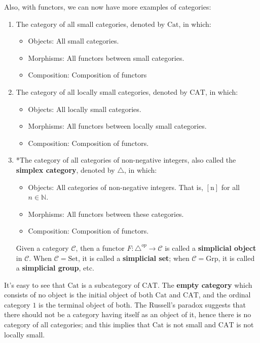	\begin{example}
	Also, with functors, we can now have more examples of categories:
		\begin{enumerate}[label=(\roman*)]
			\item The category of all small categories, denoted by $\mathrm{Cat}$, in which:
				\begin{itemize}
					\item Objects: All small categories.
					\item Morphisms: All functors between small categories.
					\item Composition: Composition of functors
				\end{itemize}
			\item The category of all locally small categories, denoted by $\mathrm{CAT}$, in which:
				\begin{itemize}
					\item Objects: All locally small categories.
					\item Morphisms: All functors between locally small categories.
					\item Composition: Composition of functors.
				\end{itemize}
				
			\item *The category of all categories of non-negative integers, also called the \textbf{simplex category}, denoted by $\triangle$, in which:
				\begin{itemize}
					\item Objects: All categories of non-negative integers. That is, $[\mathrm{n}]$ for all $n\in \mathbb{N}$.
					\item Morphisms: All functors between these categories.
					\item Composition: Composition of functors.
				\end{itemize}
		Given a category $\mathcal{C}$, then a functor $F:\triangle^{op}\to \mathcal{C}$ is called a \textbf{simplicial object} in $\mathcal{C}$. When $\mathcal{C}=\mathrm{Set}$, it is called a \textbf{simplicial set}; when $\mathcal{C}=\mathrm{Grp}$, it is called a \textbf{simplicial group}, etc.
		\end{enumerate}
	\end{example}
	It's easy to see that $\mathrm{Cat}$ is a subcategory of $\mathrm{CAT}$. The \textbf{empty category} which consists of no object is the initial object of both $\mathrm{Cat}$ and $\mathrm{CAT}$, and the ordinal category $\mathrm{1}$ is the terminal object of both. The Russell's paradox suggests that there should not be a category having itself as an object of it, hence there is no category of all categories; and this implies that $\mathrm{Cat}$ is not small and $\mathrm{CAT}$ is not locally small.\par
